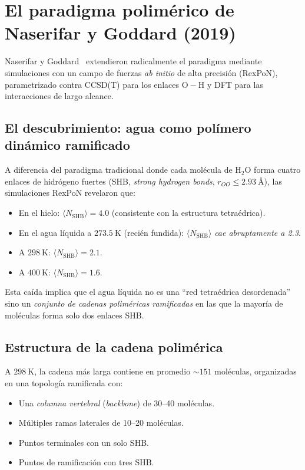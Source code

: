\section{El paradigma polimérico de Naserifar y Goddard (2019)}

Naserifar y Goddard~\cite{naserifar2019} extendieron radicalmente el paradigma 
mediante simulaciones con un campo de fuerzas \emph{ab initio} de alta precisión 
(RexPoN), parametrizado contra CCSD(T) para los enlaces $\mathrm{O{-}H}$ y DFT 
para las interacciones de largo alcance.

\subsection{El descubrimiento: agua como polímero dinámico ramificado}

A diferencia del paradigma tradicional donde cada molécula de $\mathrm{H_2O}$ 
forma cuatro enlaces de hidrógeno fuertes (SHB, \emph{strong hydrogen bonds}, 
$r_{OO} \leq \SI{2.93}{\angstrom}$), las simulaciones RexPoN revelaron que:

\begin{itemize}
\item En el hielo: $\langle N_{\mathrm{SHB}} \rangle = 4.0$ (consistente con la 
estructura tetraédrica).
\item En el agua líquida a $\SI{273.5}{\kelvin}$ (recién fundida): 
$\langle N_{\mathrm{SHB}} \rangle$ \emph{cae abruptamente a 2.3}.
\item A $\SI{298}{\kelvin}$: $\langle N_{\mathrm{SHB}} \rangle = 2.1$.
\item A $\SI{400}{\kelvin}$: $\langle N_{\mathrm{SHB}} \rangle = 1.6$.
\end{itemize}

\noindent Esta caída implica que el agua líquida no es una ``red tetraédrica 
desordenada'' sino un \emph{conjunto de cadenas poliméricas ramificadas} en las 
que la mayoría de moléculas forma solo dos enlaces SHB.

\subsection{Estructura de la cadena polimérica}

A $\SI{298}{\kelvin}$, la cadena más larga contiene en promedio 
$\sim 151$ moléculas, organizadas en una topología ramificada con:

\begin{itemize}
\item Una \emph{columna vertebral} (\emph{backbone}) de \SIrange{30}{40}{} 
moléculas.
\item Múltiples ramas laterales de \SIrange{10}{20}{} moléculas.
\item Puntos terminales con un solo SHB.
\item Puntos de ramificación con tres SHB.
\end{itemize}

